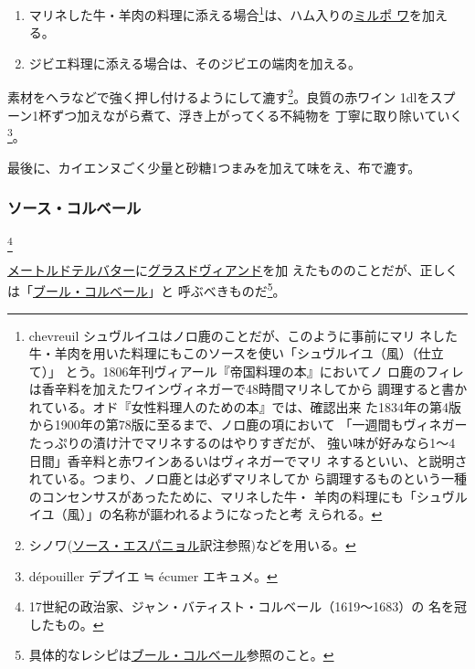 \begin{recette}
\begin{enumerate}
\def\labelenumi{\arabic{enumi}.}
\item
  マリネした牛・羊肉の料理に添える場合\footnote{chevreuil
    シュヴルイユはノロ鹿のことだが、このように事前にマリ
    ネした牛・羊肉を用いた料理にもこのソースを使い「シュヴルイユ（風）（仕立て）」
    とう。1806年刊ヴィアール『帝国料理の本』においてノ
    ロ鹿のフィレは香辛料を加えたワインヴィネガーで48時間マリネしてから
    調理すると書かれている。オド『女性料理人のための本』では、確認出来
    た1834年の第4版から1900年の第78版に至るまで、ノロ鹿の項において
    「一週間もヴィネガーたっぷりの漬け汁でマリネするのはやりすぎだが、
    強い味が好みなら1〜4日間」香辛料と赤ワインあるいはヴィネガーでマリ
    ネするといい、と説明されている。つまり、ノロ鹿とは必ずマリネしてか
    ら調理するものという一種のコンセンサスがあったために、マリネした牛・
    羊肉の料理にも「シュヴルイユ（風）」の名称が謳われるようになったと考
    えられる。}は、ハム入りの\protect\hyperlink{mirepoix}{ミルポ
  ワ}を加える。
\item
  ジビエ料理に添える場合は、そのジビエの端肉を加える。
\end{enumerate}

素材をヘラなどで強く押し付けるようにして漉す\footnote{シノワ(\protect\hyperlink{sauce-espagnole}{ソース・エスパニョル}訳注参照)などを用いる。}。良質の赤ワイン
1\undemi{}dlをスプーン1杯ずつ加えながら煮て、浮き上がってくる不純物を
丁寧に取り除いていく\footnote{dépouiller デプイエ ≒ écumer エキュメ。}。

最後に、カイエンヌごく少量と砂糖1つまみを加えて味をえ、布で漉す。

\hypertarget{sauce-colbert}{%
\subsubsection{ソース・コルベール}\label{sauce-colbert}}

\footnote{17世紀の政治家、ジャン・バティスト・コルベール（1619〜1683）の
  名を冠したもの。}


\protect\hyperlink{beurre-maitre-d-hotel}{メートルドテルバター}に\protect\hyperlink{glace-de-viande}{グラスドヴィアンド}を加
えたもののことだが、正しくは「\protect\hyperlink{beurre-colbert}{ブール・コルベール}」と
呼ぶべきものだ\footnote{具体的なレシピは\protect\hyperlink{beurre-colbert}{ブール・コルベール}参照のこと。}。


\end{recette}
